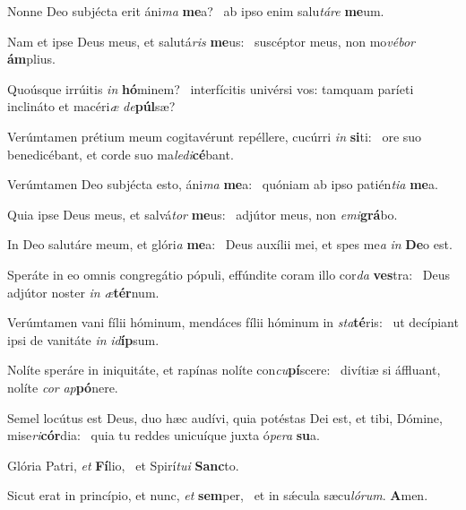 \item Nonne Deo subjécta erit áni\textit{ma} \textbf{me}a?~\psstar{} ab ipso enim salu\textit{táre} \textbf{me}um.

\item Nam et ipse Deus meus, et salutá\textit{ris} \textbf{me}us:~\psstar{} suscéptor meus, non mo\textit{vébor} \textbf{ám}plius.

\item Quoúsque irrúitis \textit{in} \textbf{hó}minem?~\psstar{} interfícitis univérsi vos: tamquam paríeti inclináto et macéri\textit{æ} \textit{de}\textbf{púl}sæ?

\item Verúmtamen prétium meum cogitavérunt repéllere, cucúrri \textit{in} \textbf{si}ti:~\psstar{} ore suo benedicébant, et corde suo ma\textit{ledi}\textbf{cé}bant.

\item Verúmtamen Deo subjécta esto, áni\textit{ma} \textbf{me}a:~\psstar{} quóniam ab ipso patién\textit{tia} \textbf{me}a.

\item Quia ipse Deus meus, et salvá\textit{tor} \textbf{me}us:~\psstar{} adjútor meus, non \textit{emi}\textbf{grá}bo.

\item In Deo salutáre meum, et glóri\textit{a} \textbf{me}a:~\psstar{} Deus auxílii mei, et spes me\textit{a} \textit{in} \textbf{De}o est.

\item Speráte in eo omnis congregátio pópuli, effúndite coram illo cor\textit{da} \textbf{ves}tra:~\psstar{} Deus adjútor noster \textit{in} \textit{æ}\textbf{tér}num.

\item Verúmtamen vani fílii hóminum, mendáces fílii hóminum in \textit{sta}\textbf{té}ris:~\psstar{} ut decípiant ipsi de vanitáte \textit{in} \textit{id}\textbf{íp}sum.

\item Nolíte speráre in iniquitáte, et rapínas nolíte con\textit{cu}\textbf{pí}scere:~\psstar{} divítiæ si áffluant, nolíte \textit{cor} \textit{ap}\textbf{pó}nere.

\item Semel locútus est Deus, duo hæc audívi, quia potéstas Dei est, et tibi, Dómine, mise\textit{ri}\textbf{cór}dia:~\psstar{} quia tu reddes unicuíque juxta ó\textit{pera} \textbf{su}a.

\item Glória Patri, \textit{et} \textbf{Fí}lio,~\psstar{} et Spirí\textit{tui} \textbf{Sanc}to.

\item Sicut erat in princípio, et nunc, \textit{et} \textbf{sem}per,~\psstar{} et in sǽcula sæcu\textit{lórum}. \textbf{A}men.
